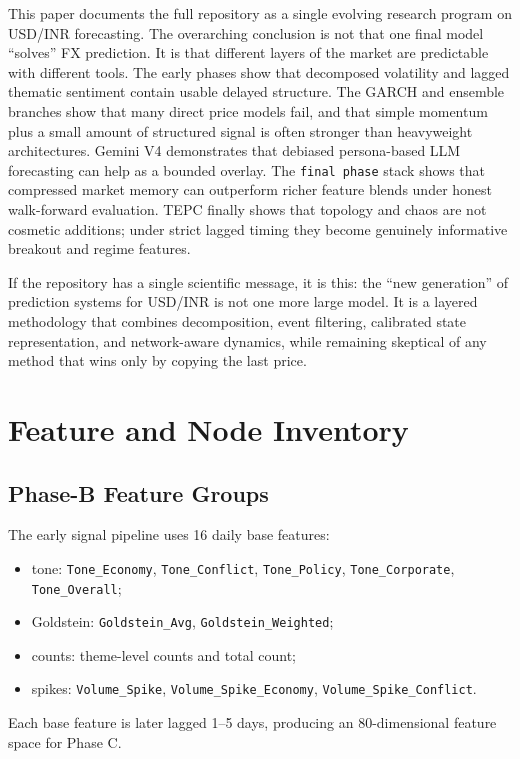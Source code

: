 \documentclass[11pt,a4paper]{article}
\begin{document}
This paper documents the full repository as a single evolving research program on USD/INR forecasting. The overarching conclusion is not that one final model ``solves'' FX prediction. It is that different layers of the market are predictable with different tools. The early phases show that decomposed volatility and lagged thematic sentiment contain usable delayed structure. The GARCH and ensemble branches show that many direct price models fail, and that simple momentum plus a small amount of structured signal is often stronger than heavyweight architectures. Gemini V4 demonstrates that debiased persona-based LLM forecasting can help as a bounded overlay. The \texttt{final phase} stack shows that compressed market memory can outperform richer feature blends under honest walk-forward evaluation. TEPC finally shows that topology and chaos are not cosmetic additions; under strict lagged timing they become genuinely informative breakout and regime features.

If the repository has a single scientific message, it is this: the ``new generation'' of prediction systems for USD/INR is not one more large model. It is a layered methodology that combines decomposition, event filtering, calibrated state representation, and network-aware dynamics, while remaining skeptical of any method that wins only by copying the last price.

\appendix

\section{Feature and Node Inventory}
\label{app:features}

\subsection{Phase-B Feature Groups}

The early signal pipeline uses 16 daily base features:
\begin{itemize}[leftmargin=*]
    \item tone: \texttt{Tone\_Economy}, \texttt{Tone\_Conflict}, \texttt{Tone\_Policy}, \texttt{Tone\_Corporate}, \texttt{Tone\_Overall};
    \item Goldstein: \texttt{Goldstein\_Avg}, \texttt{Goldstein\_Weighted};
    \item counts: theme-level counts and total count;
    \item spikes: \texttt{Volume\_Spike}, \texttt{Volume\_Spike\_Economy}, \texttt{Volume\_Spike\_Conflict}.
\end{itemize}
Each base feature is later lagged 1--5 days, producing an 80-dimensional feature space for Phase C.
\end{document}
